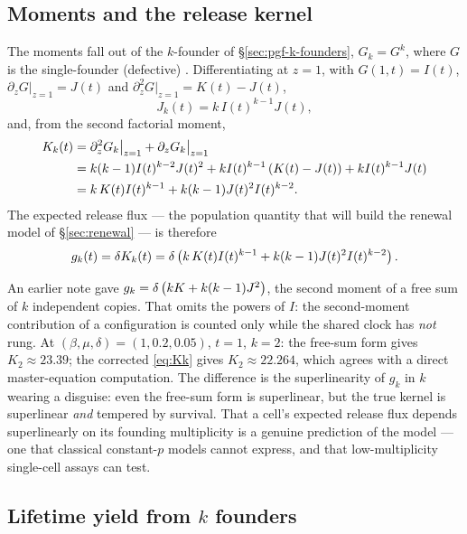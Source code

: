 \subsection{Moments and the release kernel}
\label{sec:moi-moments}

The moments fall out of the $k$-founder \pgf{} of
\S\ref{sec:pgf-k-founders}, $G_k=G^k$, where $G$ is the single-founder
(defective) \pgf. Differentiating at $z=1$, with $G(1,t)=I(t)$,
$\partial_zG|_{z=1}=J(t)$ and $\partial_z^2G|_{z=1}=K(t)-J(t)$,
\begin{equation}
J_k(t)=k\,I(t)^{k-1}J(t),
\label{eq:Jk}
\end{equation}
and, from the second factorial moment,
\begin{align}
K_k(t)&=\partial_z^2G_k\big|_{z=1}+\partial_zG_k\big|_{z=1}\nonumber\\
&=k(k-1)I(t)^{k-2}J(t)^2+kI(t)^{k-1}\left( K(t)-J(t)\right)+kI(t)^{k-1}J(t)\nonumber\\
&=k\,K(t)I(t)^{k-1}+k(k-1)J(t)^2I(t)^{k-2}.
\label{eq:Kk}
\end{align}
The expected release flux --- the population quantity that will build the
renewal model of \S\ref{sec:renewal} --- is therefore
\begin{equation}
g_k(t)=\delta K_k(t)
=\delta\left( k\,K(t)I(t)^{k-1}+k(k-1)J(t)^2I(t)^{k-2}\right).
\label{eq:gk}
\end{equation}

\begin{remark}
\label{rem:gk}
An earlier note gave $g_k=\delta\left( kK+k(k-1)J^2\right)$, the second moment of a
free sum of $k$ independent copies. That omits the powers of $I$: the
second-moment contribution of a configuration is counted only while the
shared clock has \emph{not} rung. At $(\beta,\mu,\delta)=(1,0.2,0.05)$,
$t=1$, $k=2$: the free-sum form gives $K_2\approx23.39$; the corrected
\eqref{eq:Kk} gives $K_2\approx22.264$, which agrees with a direct
master-equation computation. The difference is the superlinearity of $g_k$
in $k$ wearing a disguise: even the free-sum form is superlinear, but the
true kernel is superlinear \emph{and} tempered by survival. That a cell's
expected release flux depends superlinearly on its founding multiplicity is
a genuine prediction of the model --- one that classical constant-$p$ models
cannot express, and that low-multiplicity single-cell assays can test.
\end{remark}

\subsection{Lifetime yield from $k$ founders}


